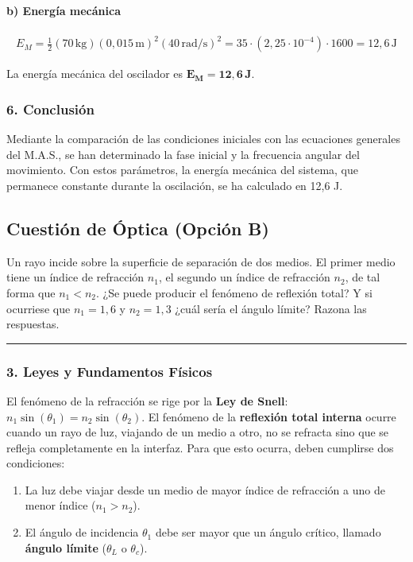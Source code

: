 \paragraph{b) Energía mecánica}
\begin{gather}
    E_M = \frac{1}{2}(70\,\text{kg})(0,015\,\text{m})^2(40\,\text{rad/s})^2 = 35 \cdot (2,25\cdot10^{-4}) \cdot 1600 = 12,6\,\text{J}
\end{gather}
\begin{cajaresultado}
La energía mecánica del oscilador es $\boldsymbol{E_M = 12,6\,\textbf{J}}$.
\end{cajaresultado}

\subsubsection*{6. Conclusión}
\begin{cajaconclusion}
Mediante la comparación de las condiciones iniciales con las ecuaciones generales del M.A.S., se han determinado la fase inicial y la frecuencia angular del movimiento. Con estos parámetros, la energía mecánica del sistema, que permanece constante durante la oscilación, se ha calculado en 12,6 J.
\end{cajaconclusion}

\newpage

\subsection{Cuestión de Óptica (Opción B)}
\label{subsec:B3_2016_jun_ord_re}

\begin{cajaenunciado}
Un rayo incide sobre la superficie de separación de dos medios. El primer medio tiene un índice de refracción $n_{1}$, el segundo un índice de refracción $n_{2}$, de tal forma que $n_{1}<n_{2}$. ¿Se puede producir el fenómeno de reflexión total? Y si ocurriese que $n_{1}=1,6$ y $n_{2}=1,3$ ¿cuál sería el ángulo límite? Razona las respuestas.
\end{cajaenunciado}
\hrule

\subsubsection*{3. Leyes y Fundamentos Físicos}
El fenómeno de la refracción se rige por la \textbf{Ley de Snell}: $n_1\sin(\theta_1) = n_2\sin(\theta_2)$.
El fenómeno de la \textbf{reflexión total interna} ocurre cuando un rayo de luz, viajando de un medio a otro, no se refracta sino que se refleja completamente en la interfaz. Para que esto ocurra, deben cumplirse dos condiciones:
\begin{enumerate}
    \item La luz debe viajar desde un medio de mayor índice de refracción a uno de menor índice ($n_1 > n_2$).
    \item El ángulo de incidencia $\theta_1$ debe ser mayor que un ángulo crítico, llamado \textbf{ángulo límite} ($\theta_L$ o $\theta_c$).
\end{enumerate}

